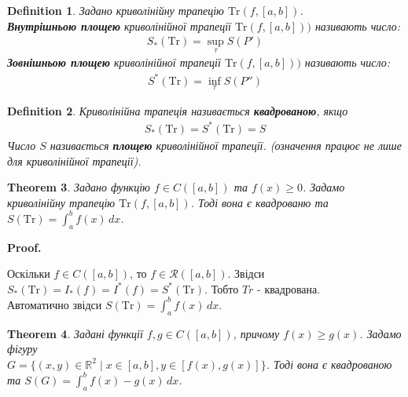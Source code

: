 \documentclass[a4paper, 10pt]{article}
\makeatletter
\def\huge{\displaystyle}
\def\qed{$\blacksquare$}
\theoremstyle{theoremdd}
\newtheorem{theorem}{Theorem}[subsection]
\theoremstyle{theoremdd}
\theoremstyle{theoremdd}
\newtheorem{definition}[theorem]{Definition}
\theoremstyle{theoremdd}
\theoremstyle{theoremdd}
\theoremstyle{theoremdd}
\theoremstyle{theoremdd}
\theoremstyle{theoremdd}
\theoremstyle{theoremdd}
\renewenvironment{proof}[1][Proof.\\]{\par
\pushQED{\hfill \qed}%
\normalfont \topsep6\p@\@plus6\p@\relax
\trivlist
\item\relax
{\bfseries
#1\@addpunct{.}}\hspace\labelsep\ignorespaces
}{%
\popQED\endtrivlist\@endpefalse
}
\makeatother
\begin{document}
\begin{definition} Задано криволінійну трапецію $\text{Tr}(f,[a,b])$.\\
\textbf{Внутрішньою площею} криволінійної трапеції $\text{Tr}(f,[a,b]))$ називають число:
\begin{align*}
S_*(\text{Tr}) = \huge\sup_{\tau} S(P')
\end{align*}
\textbf{Зовнішньою площею} криволінійної трапеції $\text{Tr}(f,[a,b]))$ називають число:
\begin{align*}
S^*(\text{Tr}) = \huge\inf_{\tau} S(P'')
\end{align*}
\end{definition}

\begin{definition}
Криволінійна трапеція називається \textbf{квадрованою}, якщо
\begin{align*}
S_*(\text{Tr}) = S^*(\text{Tr}) = S
\end{align*}
Число $S$ називається \textbf{площею} криволінійної трапеції. (означення працює не лише для криволінійної трапеції).
\end{definition}

\begin{theorem}
Задано функцію $f \in C([a,b])$ та $f(x) \geq 0$. Задамо криволінійну трапецію $\text{Tr}(f,[a,b])$. Тоді вона є квадрованю та $S(\text{Tr}) = \huge\int_a^b f(x)\,dx$.
\end{theorem}

\begin{proof}
Оскільки $f \in C([a,b])$, то $f \in \mathcal{R}([a,b])$. Звідси $S_*(\text{Tr}) = I_*(f) = I^*(f) = S^*(\text{Tr})$. Тобто $Tr$ - квадрована.\\
Автоматично звідси $S(\text{Tr}) = \huge\int_a^b f(x)\,dx$.
\end{proof}

\begin{theorem}
Задані функції $f,g \in C([a,b])$, причому $f(x) \geq g(x)$. Задамо фігуру \\ $G = \{(x,y) \in \mathbb{R}^2 \mid x \in [a,b], y \in [f(x),g(x)]\}$. Тоді вона є квадрованою та $S(G) = \huge\int_a^b f(x)-g(x)\,dx$.\\
\end{theorem}
\end{document}
